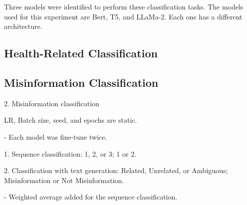 Three models were identified to perform these classification tasks. The models used for this experiment are Bert, T5, and LLaMa-2. Each one has a different architecture. 


\subsection{Health-Related Classification}



\subsection{Misinformation Classification}



2. Misinformation classification

LR, Batch size, seed, and epochs are static.

- Each model was fine-tune twice.

    1. Sequence classification: 1, 2, or 3; 1 or 2.

    2. Classification with text generation: Related, Unrelated, or Ambiguous; Misinformation or Not Misinformation.

- Weighted average added for the sequence classification.

